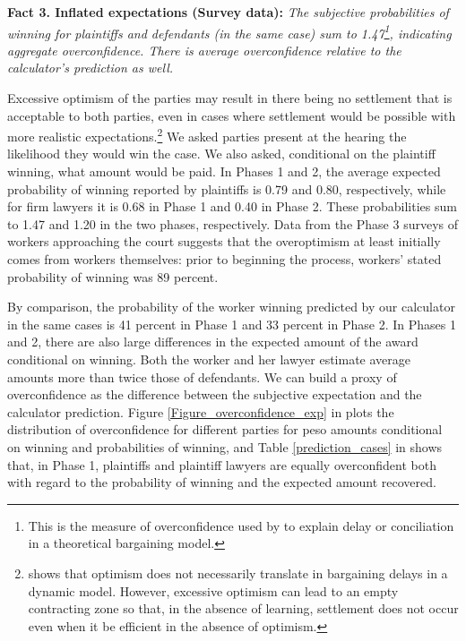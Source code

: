 \documentclass[11pt, a4paper]{article}
\begin{document}
\vspace{.15in}
\textbf{Fact 3. Inflated expectations (Survey data):} \emph{The subjective probabilities of winning for plaintiffs and defendants (in the same case) sum to 1.47\footnote{This is the measure of overconfidence used by \cite{Yildiz_CommonPrior} to explain delay or conciliation in a theoretical bargaining model.}, indicating aggregate overconfidence. There is average overconfidence relative to the calculator's prediction as well.}
\vspace{.07in}

Excessive optimism of the parties may result in there being no settlement that is acceptable to both parties, even in cases where settlement would be possible with more realistic expectations.\footnote{\cite{doi:10.1146/annurev-economics-061109-080334} shows that optimism does not necessarily translate in  bargaining delays in a dynamic model. However, excessive optimism can lead to an empty contracting zone so that, in the absence of learning, settlement does not occur even when it be efficient in the absence of optimism.} We asked parties present at the hearing the likelihood they would win the case. We also asked, conditional on the plaintiff winning, what amount would be paid. In Phases 1 and 2, the average expected probability of winning reported by plaintiffs is 0.79 and 0.80, respectively, while for firm lawyers it is 0.68 in Phase 1 and 0.40 in Phase 2. These probabilities sum to 1.47 and 1.20 in the two phases, respectively. Data from the Phase 3 surveys of workers approaching the court suggests that the overoptimism at least initially comes from workers themselves: prior to beginning the process, workers' stated probability of winning was 89 percent. 

By comparison, the probability of the worker winning predicted by our calculator in the same cases is 41 percent in Phase 1 and 33 percent in Phase 2. In Phases 1 and 2, there are also large differences in the expected amount of the award conditional on winning. Both the worker and her lawyer estimate average amounts more than twice those of defendants. We can build a proxy of overconfidence as the difference between the subjective expectation and the calculator prediction. Figure \ref{Figure_overconfidence_exp} in  plots the distribution of overconfidence for different parties for peso amounts conditional on winning and probabilities of winning, and Table \ref{prediction_cases} in  shows that, in Phase 1, plaintiffs and plaintiff lawyers are equally overconfident both with regard to the probability of winning and the expected amount recovered. 
\end{document}

